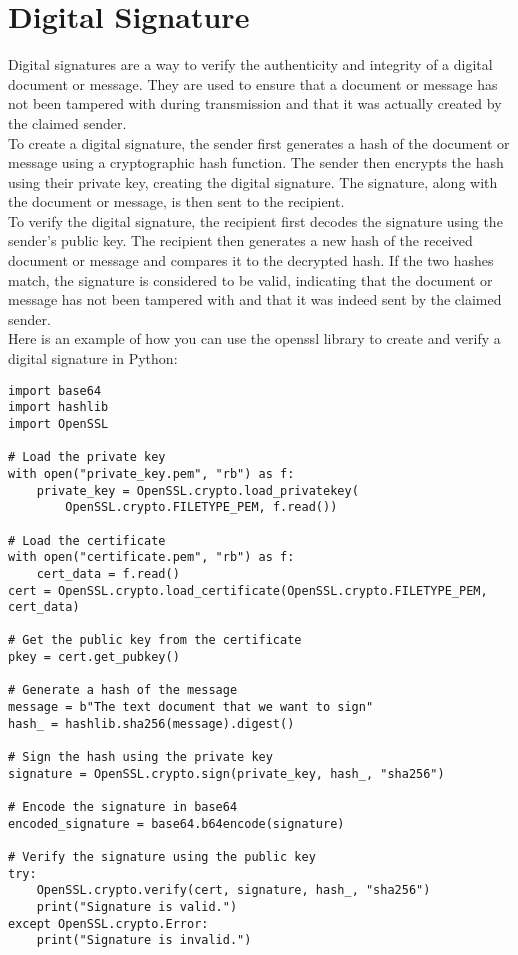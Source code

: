 \documentclass{article}
\begin{document}
\section{Digital Signature}
Digital signatures are a way to verify the authenticity and integrity of a digital document or message. They are used to ensure that a document or message has not been tampered with during transmission and that it was actually created by the claimed sender.\\
To create a digital signature, the sender first generates a hash of the document or message using a cryptographic hash function. The sender then encrypts the hash using their private key, creating the digital signature. The signature, along with the document or message, is then sent to the recipient.\\
To verify the digital signature, the recipient first decodes the signature using the sender's public key. The recipient then generates a new hash of the received document or message and compares it to the decrypted hash. If the two hashes match, the signature is considered to be valid, indicating that the document or message has not been tampered with and that it was indeed sent by the claimed sender.\\
Here is an example of how you can use the openssl library to create and verify a digital signature in Python:
\begin{lstlisting}
import base64
import hashlib
import OpenSSL

# Load the private key
with open("private_key.pem", "rb") as f:
    private_key = OpenSSL.crypto.load_privatekey(
        OpenSSL.crypto.FILETYPE_PEM, f.read())

# Load the certificate
with open("certificate.pem", "rb") as f:
    cert_data = f.read()
cert = OpenSSL.crypto.load_certificate(OpenSSL.crypto.FILETYPE_PEM, cert_data)

# Get the public key from the certificate
pkey = cert.get_pubkey()

# Generate a hash of the message
message = b"The text document that we want to sign"
hash_ = hashlib.sha256(message).digest()

# Sign the hash using the private key
signature = OpenSSL.crypto.sign(private_key, hash_, "sha256")

# Encode the signature in base64
encoded_signature = base64.b64encode(signature)

# Verify the signature using the public key
try:
    OpenSSL.crypto.verify(cert, signature, hash_, "sha256")
    print("Signature is valid.")
except OpenSSL.crypto.Error:
    print("Signature is invalid.")
\end{lstlisting}
\end{document}
